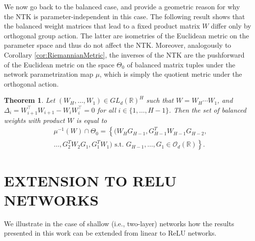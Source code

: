 \documentclass[twoside]{article}
\newtheorem{theorem}{Theorem}
\theoremstyle{definition}
\theoremstyle{remark}
\begin{document}
We now go back to the balanced case, and provide a geometric reason for why  the NTK is parameter-independent in this case.
The following result shows that the balanced weight matrices that lead to a fixed product matrix $W$ differ only by orthogonal group action. The latter are isometries of the Euclidean metric on the parameter space and thus do not affect the NTK. Moreover, analogously to Corollary \ref{cor:RiemannianMetric}, the inverses of the NTK are the pushforward of the Euclidean metric on the space $\Theta_0$ of balanced matrix tuples under the network parametrization map $\mu$, which is simply the quotient metric under the orthogonal action.
\begin{theorem}\label{thm:fullyconnected}
    Let $(W_H,\ldots,W_1) \in GL_d(\mathbb{R})^H$ such that $W=W_H \cdots W_1$, and $\Delta_i = W_{i+1}^\top W_{i+1} - W_{i}W_i^\top=0$ for all $i \in \{1,\ldots,H-1\}$. Then the set of balanced weights with product  $W$  is equal to
    \begin{align*}
        &  \mu^{-1}(W) \cap \Theta_0 = \left\{  (W_HG_{H-1},G_{H-1}^{T}W_{H-1}G_{H-2}, \right. \\ & \left. \ldots,   G_{2}^{T}W_{2}G_{1},   G_{1}^{T}W_{1}) \mbox{ s.t. } G_{H-1},\ldots,G_1 \in \mathcal{O}_d(\mathbb{R}) \right\}.
    \end{align*}
\end{theorem}



\section{EXTENSION TO RELU NETWORKS} \label{sec:relu}
We illustrate in the case of shallow (i.e., two-layer) networks how the results presented in this work can be extended from linear to ReLU networks. 
\end{document}
